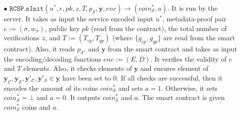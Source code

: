 \begin{definition}[RC-S-P Scheme]
\begin{itemize}
\


\item[$\bullet$] $\mathtt{RCSP}.\mathtt{sInit}(u^{\scriptscriptstyle *},e, pk,z, T, p_{\scriptscriptstyle\mathcal S},\bm{y},enc)\rightarrow (coin^{\scriptscriptstyle *}_{\scriptscriptstyle\mathcal S},a)$. It is  run by the server. It takes as input the  service encoded input $u^{\scriptscriptstyle *}$, metadata-proof pair $e:=(\sigma,w_{\scriptscriptstyle\sigma})$,   public key $pk$ (read from the contract), the total number of verifications $z$, and $T:=(T_{\scriptscriptstyle cp},T_{\scriptscriptstyle qp})$ (where $\{g_{\scriptscriptstyle cp},  g_{\scriptscriptstyle qp}\}$ are read from the smart contract). Also, it reads $p_{\scriptscriptstyle\mathcal S}$, and $\bm{y}$ from the smart contract and takes as input the encoding/decoding functions $enc:=(E,D)$. It verifies the validity of $e$ and  $T$ elements. Also, it checks elements of $\bm{y}$ and ensures element of $\bm{y}_{\scriptscriptstyle \mathcal  C}, \bm{y}_{\scriptscriptstyle \mathcal  S},\bm{y}'_{\scriptscriptstyle \mathcal  C}, \bm{y}'_{\scriptscriptstyle \mathcal  S}\in \bm{y}$ have been set to $0$. If all checks are successful, then it encodes the amount of its coins  $coin^{\scriptscriptstyle*}_{\scriptscriptstyle\mathcal S}$ and sets $a=1$. Otherwise, it sets $coin^{\scriptscriptstyle *}_{\scriptscriptstyle\mathcal S}=\bot$ and $a=0$. It outputs $coin^{\scriptscriptstyle *}_{\scriptscriptstyle\mathcal S}$ and $a$. The smart contract is given $coin^{\scriptscriptstyle *}_{\scriptscriptstyle\mathcal S}$ coins and $a$.  




\end{itemize}
\end{definition}
